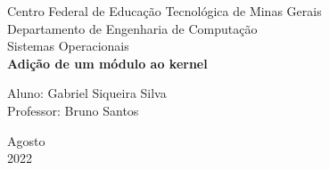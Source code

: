 \documentclass[a4paper, 12pt]{article}
\begin{document}

\begin{titlepage}
	\begin{center}
	

		\large{Centro Federal de Educação Tecnológica de Minas Gerais}\\
		\large{Departamento de Engenharia de Computação}\\ 
		\large{Sistemas Operacionais}\\ 
		\vspace{15pt}
        \vspace{95pt}
        \textbf{\LARGE{Adição de um módulo ao kernel}}\\
		\vspace{3,5cm}
	\end{center}
	
	\begin{flushleft}
		\begin{tabbing}
			Aluno: Gabriel Siqueira Silva \\
			Professor: Bruno Santos \\
		\end{tabbing}
 \end{flushleft}
	\vspace{1cm}
	
	\begin{center}
		\vspace{\fill}
			 Agosto\\
		      2022
			\end{center}
\end{titlepage}

\end{document}
